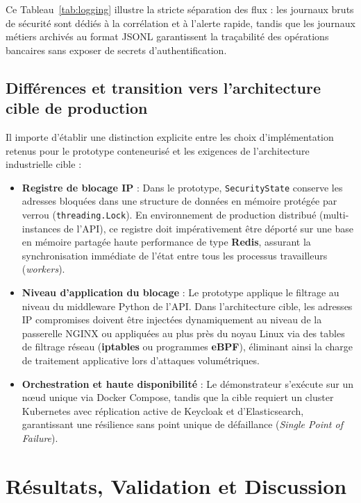 Ce Tableau~\ref{tab:logging} illustre la stricte séparation des flux : les journaux bruts de sécurité sont dédiés à la corrélation et à l'alerte rapide, tandis que les journaux métiers archivés au format JSONL garantissent la traçabilité des opérations bancaires sans exposer de secrets d'authentification.

\subsection{Différences et transition vers l'architecture cible de production}
Il importe d'établir une distinction explicite entre les choix d'implémentation retenus pour le prototype conteneurisé et les exigences de l'architecture industrielle cible :
\begin{itemize}[leftmargin=*]
    \item \textbf{Registre de blocage IP} : Dans le prototype, \texttt{SecurityState} conserve les adresses bloquées dans une structure de données en mémoire protégée par verrou (\texttt{threading.Lock}). En environnement de production distribué (multi-instances de l'API), ce registre doit impérativement être déporté sur une base en mémoire partagée haute performance de type \textbf{Redis}, assurant la synchronisation immédiate de l'état entre tous les processus travailleurs (\textit{workers}).
    \item \textbf{Niveau d'application du blocage} : Le prototype applique le filtrage au niveau du middleware Python de l'API. Dans l'architecture cible, les adresses IP compromises doivent être injectées dynamiquement au niveau de la passerelle NGINX ou appliquées au plus près du noyau Linux via des tables de filtrage réseau (\textbf{iptables} ou programmes \textbf{eBPF}), éliminant ainsi la charge de traitement applicative lors d'attaques volumétriques.
    \item \textbf{Orchestration et haute disponibilité} : Le démonstrateur s'exécute sur un nœud unique via Docker Compose, tandis que la cible requiert un cluster Kubernetes avec réplication active de Keycloak et d'Elasticsearch, garantissant une résilience sans point unique de défaillance (\textit{Single Point of Failure}).
\end{itemize}

\clearpage
\section{Résultats, Validation et Discussion}


